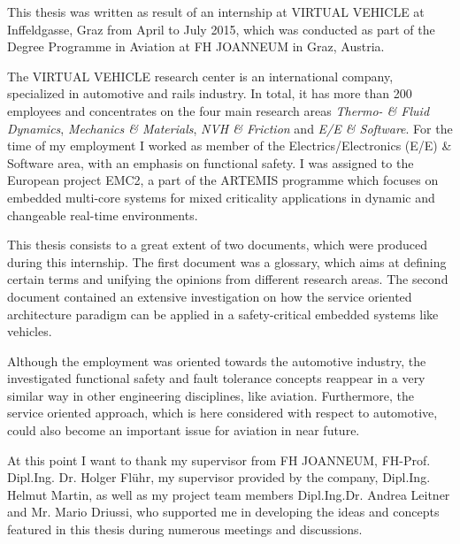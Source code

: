 This thesis was written as result of an internship at VIRTUAL VEHICLE at Inffeldgasse, Graz from April to July 2015, which was conducted as part of the Degree Programme in Aviation at FH JOANNEUM in Graz, Austria.

The VIRTUAL VEHICLE research center is an international company, specialized in automotive and rails industry. In total, it has more than 200 employees and concentrates on the four main research areas \emph{Thermo- \& Fluid Dynamics}, \emph{Mechanics \& Materials}, \emph{NVH \& Friction} and \emph{E/E \& Software}. For the time of my employment I worked as member of the Electrics/Electronics (E/E) \& Software area, with an emphasis on functional safety. I was assigned to the European project EMC2, a part of the ARTEMIS programme which focuses on embedded multi-core systems for mixed criticality applications in dynamic and changeable real-time environments. 

This thesis consists to a great extent of two documents, which were produced during this internship. The first document was a glossary, which aims at defining certain terms and unifying the opinions from different research areas. The second document contained an extensive investigation on how the service oriented architecture paradigm can be applied in a safety-critical embedded systems like vehicles.

Although the employment was oriented towards the automotive industry, the investigated functional safety and fault tolerance concepts reappear in a very similar way in other engineering disciplines, like aviation. Furthermore, the service oriented approach, which is here considered with respect to automotive, could also become an important issue for aviation in near future.

At this point I want to thank my supervisor from FH JOANNEUM, FH-Prof. Dipl.Ing. Dr. Holger Flühr, my supervisor provided by the company, Dipl.Ing. Helmut Martin, as well as my project team members Dipl.Ing.Dr. Andrea Leitner and Mr. Mario Driussi, who supported me in developing the ideas and concepts featured in this thesis during numerous meetings and discussions.
